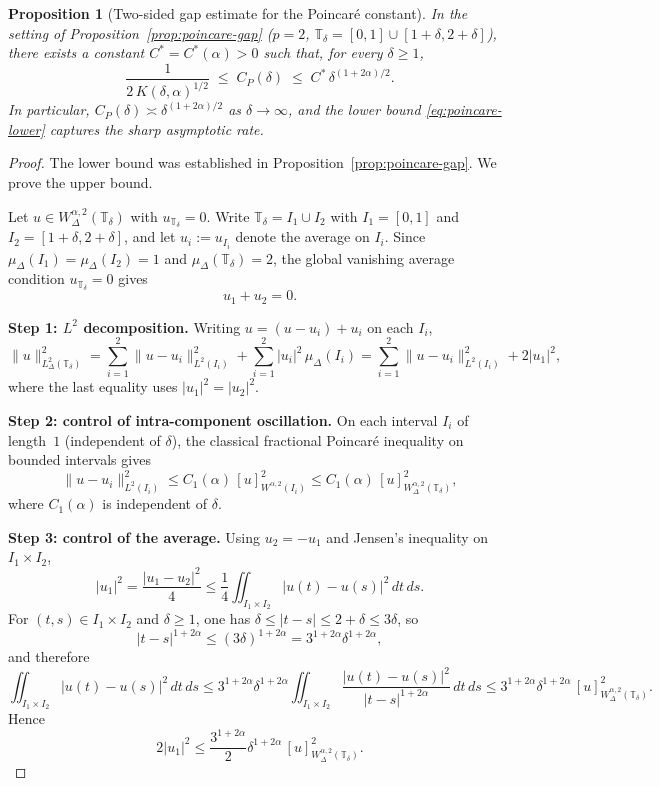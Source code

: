 \documentclass[11pt,a4paper]{article}
\numberwithin{equation}{section}
\newtheorem{proposition}[proposition]{Proposition}
\theoremstyle{definition}
\begin{document}
\begin{proposition}[Two-sided gap estimate for the Poincar\'e constant]
\label{prop:two-sided-poincare}
In the setting of Proposition~\ref{prop:poincare-gap} ($p = 2$, 
$\mathbb{T}_\delta = [0,1] \cup [1+\delta, 2+\delta]$), there exists a 
constant $C^* = C^*(\alpha) > 0$ such that, for every $\delta \ge 1$,
\begin{equation}\label{eq:two-sided-poincare}
\frac{1}{2 \, K(\delta, \alpha)^{1/2}} 
\;\le\; C_P(\delta) 
\;\le\; C^* \, \delta^{(1+2\alpha)/2}.
\end{equation}
In particular, $C_P(\delta) \asymp \delta^{(1+2\alpha)/2}$ as 
$\delta \to \infty$, and the lower bound \eqref{eq:poincare-lower} 
captures the sharp asymptotic rate.
\end{proposition}

\begin{proof}
The lower bound was established in Proposition~\ref{prop:poincare-gap}. 
We prove the upper bound.

Let $u \in W^{\alpha,2}_\Delta(\mathbb{T}_\delta)$ with 
$u_{\mathbb{T}_\delta} = 0$. Write $\mathbb{T}_\delta = I_1 \cup I_2$ with 
$I_1 = [0,1]$ and $I_2 = [1+\delta, 2+\delta]$, and let 
$u_i := u_{I_i}$ denote the average on $I_i$. Since 
$\mu_\Delta(I_1) = \mu_\Delta(I_2) = 1$ and $\mu_\Delta(\mathbb{T}_\delta) = 2$, 
the global vanishing average condition $u_{\mathbb{T}_\delta} = 0$ gives
\[
u_1 + u_2 = 0.
\]

\smallskip
\noindent\textbf{Step 1: $L^2$ decomposition.} Writing 
$u = (u - u_i) + u_i$ on each $I_i$,
\[
\|u\|^2_{L^2_\Delta(\mathbb{T}_\delta)} 
= \sum_{i=1}^2 \|u - u_i\|^2_{L^2(I_i)} + \sum_{i=1}^2 |u_i|^2 \, \mu_\Delta(I_i)
= \sum_{i=1}^2 \|u - u_i\|^2_{L^2(I_i)} + 2|u_1|^2,
\]
where the last equality uses $|u_1|^2 = |u_2|^2$.

\smallskip
\noindent\textbf{Step 2: control of intra-component oscillation.} On each 
interval $I_i$ of length~$1$ (independent of $\delta$), the classical 
fractional Poincar\'e inequality on bounded intervals gives
\[
\|u - u_i\|^2_{L^2(I_i)} 
\le C_1(\alpha) \, [u]^2_{W^{\alpha,2}(I_i)} 
\le C_1(\alpha) \, [u]^2_{W^{\alpha,2}_\Delta(\mathbb{T}_\delta)},
\]
where $C_1(\alpha)$ is independent of $\delta$.

\smallskip
\noindent\textbf{Step 3: control of the average.} Using $u_2 = -u_1$ and 
Jensen's inequality on $I_1 \times I_2$,
\[
|u_1|^2 = \frac{|u_1 - u_2|^2}{4} 
\le \frac{1}{4} \iint_{I_1 \times I_2} |u(t) - u(s)|^2 \, dt \, ds.
\]
For $(t,s) \in I_1 \times I_2$ and $\delta \ge 1$, one has 
$\delta \le |t-s| \le 2 + \delta \le 3\delta$, so
\[
|t-s|^{1+2\alpha} \le (3\delta)^{1+2\alpha} = 3^{1+2\alpha} \delta^{1+2\alpha},
\]
and therefore
\[
\iint_{I_1 \times I_2} |u(t) - u(s)|^2 \, dt \, ds 
\le 3^{1+2\alpha} \delta^{1+2\alpha} 
\iint_{I_1 \times I_2} \frac{|u(t) - u(s)|^2}{|t-s|^{1+2\alpha}} \, dt \, ds 
\le 3^{1+2\alpha} \delta^{1+2\alpha} \, [u]^2_{W^{\alpha,2}_\Delta(\mathbb{T}_\delta)}.
\]
Hence
\[
2|u_1|^2 \le \frac{3^{1+2\alpha}}{2} \delta^{1+2\alpha} \, 
[u]^2_{W^{\alpha,2}_\Delta(\mathbb{T}_\delta)}.
\]


\end{proof}
\end{document}

